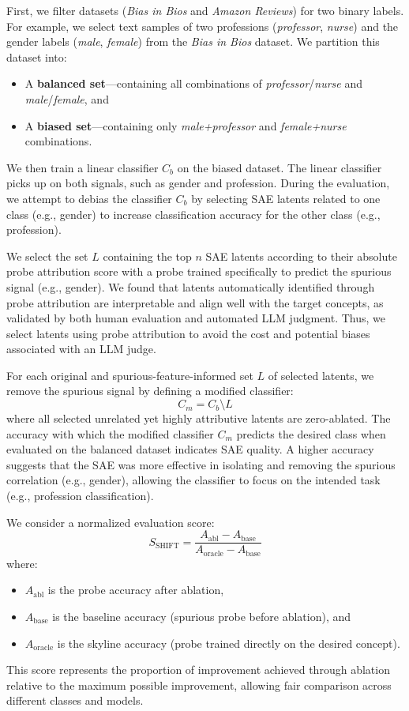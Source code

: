 \documentclass{article}
\theoremstyle{plain}
\theoremstyle{definition}
\theoremstyle{remark}
\begin{document}
First, we filter datasets (\textit{Bias in Bios} and \textit{Amazon Reviews}) for two binary labels. For example, we select text samples of two professions (\textit{professor}, \textit{nurse}) and the gender labels (\textit{male}, \textit{female}) from the \textit{Bias in Bios} dataset. We partition this dataset into:
\begin{itemize}
    \item A \textbf{balanced set}—containing all combinations of \textit{professor}/\textit{nurse} and \textit{male}/\textit{female}, and
    \item A \textbf{biased set}—containing only \textit{male+professor} and \textit{female+nurse} combinations.
\end{itemize}
We then train a linear classifier $C_b$ on the biased dataset. The linear classifier picks up on both signals, such as gender and profession. During the evaluation, we attempt to debias the classifier $C_b$ by selecting SAE latents related to one class (e.g., gender) to increase classification accuracy for the other class (e.g., profession).

We select the set $L$ containing the top $n$ SAE latents according to their absolute probe attribution score with a probe trained specifically to predict the spurious signal (e.g., gender). We found that latents automatically identified through probe attribution are interpretable and align well with the target concepts, as validated by both human evaluation and automated LLM judgment. Thus, we select latents using probe attribution to avoid the cost and potential biases associated with an LLM judge.

For each original and spurious-feature-informed set $L$ of selected latents, we remove the spurious signal by defining a modified classifier:
\[
C_m = C_b \setminus L
\]
where all selected unrelated yet highly attributive latents are zero-ablated. The accuracy with which the modified classifier $C_m$ predicts the desired class when evaluated on the balanced dataset indicates SAE quality. A higher accuracy suggests that the SAE was more effective in isolating and removing the spurious correlation (e.g., gender), allowing the classifier to focus on the intended task (e.g., profession classification).

We consider a normalized evaluation score:
\[
S_\text{SHIFT} = \frac{A_\text{abl} - A_\text{base}}{A_\text{oracle} - A_\text{base}}
\]
where:
\begin{itemize}
    \item $A_\text{abl}$ is the probe accuracy after ablation,
    \item $A_\text{base}$ is the baseline accuracy (spurious probe before ablation), and
    \item $A_\text{oracle}$ is the skyline accuracy (probe trained directly on the desired concept).
\end{itemize}
This score represents the proportion of improvement achieved through ablation relative to the maximum possible improvement, allowing fair comparison across different classes and models.
\end{document}
